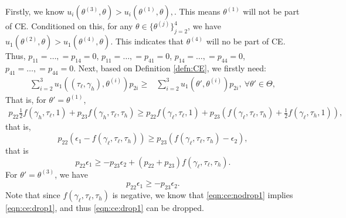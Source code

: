 Firstly, we know $u_i(\theta^{(3)},\theta)> u_i(\theta^{(1)},\theta),$. This means $\theta^{(1)}$ will not be part of CE. Conditioned on this, for any $\theta\in\{\theta^{(j)}\}_{j=2}^4$, we have
$u_1(\theta^{(2)},\theta)> u_1(\theta^{(4)},\theta).$ This indicates that $\theta^{(4)}$ will no be part of CE. Thus, $p_{11}=\dots,=p_{14}=0$, $p_{11}=\dots,=p_{41}=0$, $p_{14}=\dots,=p_{44}=0$, $p_{41}=\dots,=p_{44}=0$. Next, based on Definition \ref{defn:CE}, we firstly need:
\begin{equation*}
    \begin{split}
     \sum_{i=2}^3 u_1\left((\tau_{\ell},\gamma_{h}),\theta^{(i)}\right)p_{2i} \geq {} &    \sum_{i=2}^3 u_1\left(\theta',\theta^{(i)}\right)p_{2i},\ \forall \theta'\in\Theta, 
    \end{split}
\end{equation*}
That is, for $\theta'=\theta^{(1)}$,
\begin{equation*}
    \begin{split}
 p_{22}\frac{1}{2}f(\gamma_h,\tau_{\ell},1) + p_{23} f(\gamma_h,\tau_{\ell},\tau_{h}) \geq  p_{22} f(\gamma_{\ell},\tau_{\ell},1) + p_{23} (f(\gamma_{\ell},\tau_{\ell},\tau_h)+\frac{1}{2}f(\gamma_{\ell},\tau_h,1)),     
    \end{split}
\end{equation*}
that is, 
$$ p_{22}(\epsilon_1-f(\gamma_{\ell},\tau_{\ell},\tau_h) )\geq p_{23}(f(\gamma_{\ell},\tau_{\ell},\tau_h)-\epsilon_2  ),$$
that is 
\begin{equation}
\label{eqn:ce:drop1}
    p_{22}\epsilon_1 \geq -p_{23}\epsilon_2 + (p_{22}+p_{23})f(\gamma_{\ell},\tau_{\ell},\tau_h). 
\end{equation}
For $\theta'=\theta^{(3)}$, we have 
\begin{equation}
\label{eqn:ce:nodrop1}
     p_{22}\epsilon_1 \geq  -p_{23}\epsilon_2.
\end{equation}
Note that since 
$f(\gamma_{\ell},\tau_{\ell},\tau_h)$ is negative, we know that \eqref{eqn:ce:nodrop1} implies \eqref{eqn:ce:drop1}, and thus \eqref{eqn:ce:drop1} can be dropped. 

